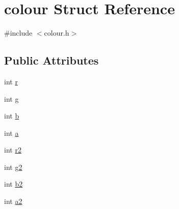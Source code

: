 \hypertarget{structcolour}{\section{colour Struct Reference}
\label{structcolour}
}


{\ttfamily \#include $<$colour.\-h$>$}

\subsection*{Public Attributes}
\begin{DoxyCompactItemize}
\item 
int \hyperlink{structcolour_af6ffd9e61ca4986697eae2c1b538cf8c}{r}
\item 
int \hyperlink{structcolour_ab8abffbeaa8d24f16f61584215586ccf}{g}
\item 
int \hyperlink{structcolour_a5e4726c3fde32824d03c3f9beea39e24}{b}
\item 
int \hyperlink{structcolour_afb6afffbac43ce8fb1170b8650a9564d}{a}
\item 
int \hyperlink{structcolour_a4824403252ea1a30ea97cbc079bdd6d4}{r2}
\item 
int \hyperlink{structcolour_a0c38221b7aae8ec657f70be4f49517d9}{g2}
\item 
int \hyperlink{structcolour_afcfbcb0958f36a5fa84c92a86a1a6cad}{b2}
\item 
int \hyperlink{structcolour_ad85be043df7822f3ad3fb949592b73f6}{a2}
\end{DoxyCompactItemize}


